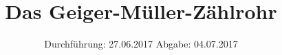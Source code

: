 

\subject{V703}
\title{Das Geiger-Müller-Zählrohr}
\date{
\centering
  Durchführung: 27.06.2017
  \hspace{3em}
  Abgabe: 04.07.2017
}



\maketitle
\thispagestyle{empty}
\tableofcontents
\newpage







\printbibliography


